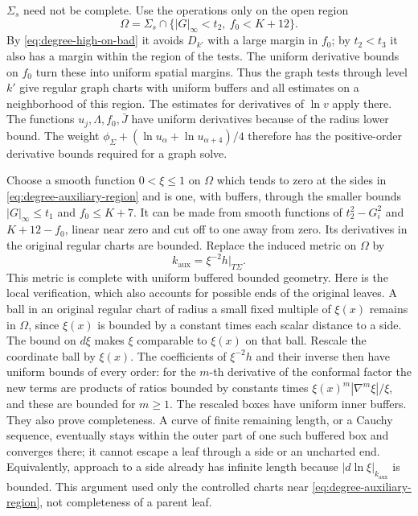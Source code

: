 $\Sigma_s$ need not be complete.  Use the operations
only on the open region
\begin{equation}\label{eq:degree-auxiliary-region}
       \Omega=\Sigma_s\cap\{|G|_\infty<t_2,\ f_0<K+12\}.
\end{equation}
By \eqref{eq:degree-high-on-bad} it avoids $D_{k'}$ with a large margin in
$f_0$; by $t_2<t_3$ it also has a margin within the region of the tests.
The uniform derivative bounds on $f_0$ turn these into uniform spatial
margins.  Thus the graph tests through level $k'$ give regular graph
charts with uniform buffers and all estimates on a neighborhood of this
region.  The estimates for derivatives of $\ln v$ apply there.  The
functions $u_j,\Lambda,f_0,\bar J$ have uniform derivatives because of
the radius lower bound.  The weight
$\phi_\Sigma+(\ln u_\alpha+\ln u_{\alpha+4})/4$ therefore has the
positive-order derivative bounds required for a graph solve.

Choose a smooth function $0<\xi\le1$ on $\Omega$ which tends to zero
at the sides in \eqref{eq:degree-auxiliary-region} and is one, with
buffers, through the smaller bounds $|G|_\infty\le t_1$ and
$f_0\le K+7$.  It can be made from smooth functions of
$t_2^2-G_i^2$ and $K+12-f_0$, linear near zero and cut off to one away
from zero.  Its derivatives in the original regular charts are bounded.
Replace the induced metric on $\Omega$ by
\[
                              k_{\mathrm{aux}}=\xi^{-2}h|_{T\Sigma}.
\]
This metric is complete with uniform buffered bounded geometry.  Here is
the local verification, which also accounts for possible ends of the
original leaves.  A ball in an original regular chart of radius a small
fixed multiple of $\xi(x)$ remains in $\Omega$, since $\xi(x)$ is bounded
by a constant times each scalar distance to a side.  The bound on
$d\xi$ makes $\xi$ comparable to $\xi(x)$ on that ball.  Rescale the
coordinate ball by $\xi(x)$.  The coefficients of $\xi^{-2}h$ and their
inverse then have uniform bounds of every order: for the $m$-th derivative
of the conformal factor the new terms are products of ratios bounded by
constants times $\xi(x)^m|\nabla^m\xi|/\xi$, and these are bounded for
$m\ge1$.
The rescaled boxes have uniform inner buffers.  They also prove
completeness.  A curve of finite remaining length, or a Cauchy sequence,
eventually stays within the outer part of one such buffered box and
converges there; it cannot escape a leaf through a side or an uncharted
end.  Equivalently, approach to a side already has infinite length
because $|d\ln\xi|_{k_{\mathrm{aux}}}$ is bounded.  This argument used
only the controlled charts near \eqref{eq:degree-auxiliary-region},
not completeness of a parent leaf.


